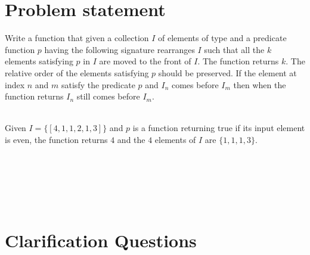 \section{Problem statement}
\begin{exercise}
\label{example:remove_all_occurrences_unsorted_array_inplace:exercice1}
Write a function that given a collection $I$ of elements of type
  and a predicate function $p$ having the following signature
  rearranges $I$ such that
 all the $k$ elements satisfying $p$  in $I$ are moved to the front of $I$.
 The function returns $k$.
 The relative order of the elements  satisfying $p$ should be preserved. 
 If the element at index $n$ and $m$ satisfy the predicate $p$  and $I_n$ comes before $I_m$ then
 when the function returns $I_n$ still comes before $I_m$.
 
	\begin{example}
		\label{example:remove_all_occurrences_unsorted_array_inplace:example1}
		\hfill \\
		Given $I = \{[4, 1, 1, 2, 1, 3]\}$ and $p$ is a function returning true if its input element is 
		even, the function returns $4$ and the $4$ elements of $I$ are $\{1,1,1,3\}$. 
		
	\end{example}

	\begin{example}
		\label{example:remove_all_occurrences_unsorted_array_inplace:example2}
		\hfill \
		
	\end{example}

	\begin{example}
		\hfill \
	
	\label{ex:remove_all_occurrences_unsorted_array_inplace:example3}
	\end{example}

	\begin{example}
		\hfill \

	\label{ex:remove_all_occurrences_unsorted_array_inplace:example4}	
	\end{example}
\end{exercise}

\section{Clarification Questions}

\begin{QandA}
	\item 
	\begin{answered}
		\textit{}
	\end{answered}
	
\end{QandA}

